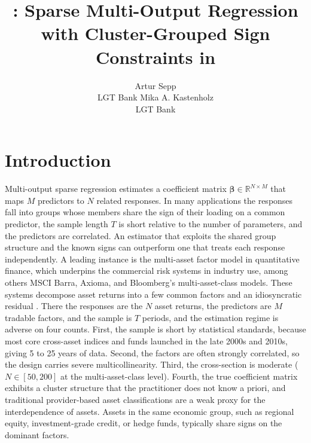 \documentclass[article]{jss}
\author{Artur Sepp\\LGT Bank
\And Mika A. Kastenholz\\LGT Bank}
\title{\pkg{factorlasso}: Sparse Multi-Output Regression with
Cluster-Grouped Sign Constraints in \proglang{Python}}
\begin{document}

\section[Introduction]{Introduction} \label{sec:intro}

Multi-output sparse regression estimates a coefficient matrix
$\bm{\beta} \in \mathbb{R}^{N \times M}$ that maps $M$ predictors to $N$
related responses. In many applications the responses fall into groups
whose members share the sign of their loading on a common predictor, the
sample length $T$ is short relative to the number of parameters, and the
predictors are correlated. An estimator that exploits the shared group
structure and the known signs can outperform one that treats each response
independently. A leading instance is the multi-asset factor model in
quantitative finance, which underpins the commercial risk systems in
industry use, among others MSCI Barra, Axioma, and Bloomberg's
multi-asset-class models. These systems decompose asset returns into a few
common factors and an idiosyncratic residual
\citep{Rosenberg+McKibben:1973, Connor:1995}. There the responses are the
$N$ asset returns, the predictors are $M$ tradable factors, and the sample
is $T$ periods, and the estimation regime is adverse on four counts. First,
the sample is short by statistical standards, because most core cross-asset
indices and funds launched in the late 2000s and 2010s, giving 5 to 25 years
of data. Second, the factors are often strongly correlated, so the design
carries severe multicollinearity. Third, the cross-section is moderate
($N \in [50, 200]$ at the multi-asset-class level). Fourth, the true
coefficient matrix exhibits a cluster structure that the practitioner does
not know a priori, and traditional provider-based asset classifications are
a weak proxy for the interdependence of assets. Assets in the same economic
group, such as regional equity, investment-grade credit, or hedge funds,
typically share signs on the dominant factors.
\end{document}
